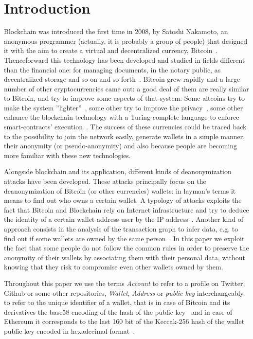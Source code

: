 \section{Introduction}
Blockchain was introduced the first time in 2008, by Satoshi Nakamoto, an
anonymous programmer (actually, it is probably a group of people) that
designed it with the aim to create a virtual and decentralized currency,
Bitcoin~\cite{bib:satoshi}.
Thenceforward this technology has been developed and
studied in fields different than the financial one: for managing documents, in
the notary public, as decentralized storage and so on and so
forth~\cite{bib:air}. Bitcoin grew
rapidly and a large number of other cryptocurrencies came out:
a good deal of them are really
similar to Bitcoin, and try to improve some aspects of that system. Some
altcoins try to make the system ''lighter''~\cite{bib:litecoin:wiki},
some other try to improve the privacy~\cite{bib:zerocoin:white_paper,
bib:zerocash:white_paper,
bib:monero:white_paper}, some other enhance the blockchain technology with a
Turing-complete language to enforce smart-contracts'
execution~\cite{bib:ethereum:whitepaper}.
The success of these
currencies could be traced back to the possibility to join the network easily,
generate wallets in a simple manner,
their anonymity (or pseudo-anonymity) and also because people are
becoming more familiar with these new technologies.


Alongside blockchain and its application, different kinds of deanonymization
attacks have been developed.
These attacks principally focus on the
deanonymization of Bitcoin (or other currencies) wallets: in layman's terms
it means to find out who owns a certain wallet.
A typology of attacks exploits the fact that Bitcoin and Blockchain rely
on Internet infrastructure and try to deduce the identity of a certain wallet
address user by the IP address~\cite{bib:deanon}.
Another kind of approach consists in the analysis of the transaction graph
to infer data, e.g. to find out if some wallets are owned by the same
person~\cite{bib:fistful}.
In this paper we exploit the fact that some people do not follow the common
rules in order to preserve the anonymity of their wallets by associating them
with their personal data, without knowing that they risk to compromise even
other wallets owned by them.

Throughout this paper we use the terms \emph{Account} to refer to a profile
on Twitter, Github or some other repositories,
\emph{Wallet}, \emph{Address} or \emph{public key} interchangeably to refer
to the unique identifier of a wallet, that is in case of Bitcoin and its
derivatives the base58-encoding of the hash of the public
key~\cite{bib:bitcoin:mastering} and in case of
Ethereum it corresponds to the last 160 bit of the Keccak-256 hash of the
wallet public key encoded in hexadecimal 
format~\cite{bib:ethereum:yellow:paper}.

